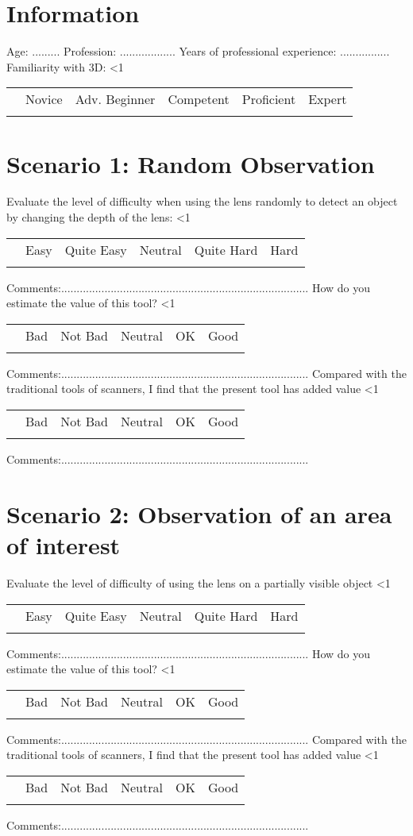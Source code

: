 \documentclass[a4paper]{exam}
\makeatletter
\newcounter{mquestion}
\newcounter{row}
\newcommand\addtabtoks[1]{\@tabtoks\expandafter{\the\@tabtoks#1}}
\newcommand*\resettabtoks{\@tabtoks{}}
\newcommand*\printtabtoks{\the\@tabtoks}
\newcommand\CheckTable[1]{%
  \setcounter{mquestion}{0}
  \setcounter{row}{0}
  \resettabtoks
  \loop\ifnum\therow<#1\relax
    \stepcounter{row}
    \addtabtoks{& $\square$ & $\square$ & $\square$ & $\square$ & $\square$ \\}%
  \repeat
  \begin{longtable}{>{\stepcounter{mquestion}}l*{5}{c}}
    \multicolumn{1}{c}{} & Bad & Not Bad & Neutral & OK & Good \\
    \printtabtoks
  \end{longtable}%
}
\newcommand\CheckTablelevel[1]{%
  \setcounter{mquestion}{0}
  \setcounter{row}{0}
  \resettabtoks
  \loop\ifnum\therow<#1\relax
    \stepcounter{row}
    \addtabtoks{& $\square$ & $\square$ & $\square$ & $\square$ & $\square$ \\}%
  \repeat
  \begin{longtable}{>{\stepcounter{mquestion}}l*{5}{c}}
    \multicolumn{1}{c}{} & Novice &  Adv. Beginner &  Competent & Proficient  & Expert \\
    \printtabtoks
  \end{longtable}%
}
\newcommand\CheckTableDifficulty[1]{%
  \setcounter{mquestion}{0}
  \setcounter{row}{0}
  \resettabtoks
  \loop\ifnum\therow<#1\relax
    \stepcounter{row}
    \addtabtoks{& $\square$ & $\square$ & $\square$ & $\square$ & $\square$ \\}%
  \repeat
  \begin{longtable}{>{\stepcounter{mquestion}}l*{5}{c}}
    \multicolumn{1}{c}{} & Easy & Quite Easy & Neutral & Quite Hard & Hard \\
    \printtabtoks
  \end{longtable}%
}
\makeatother
\begin{document}
\section{Information}

 Age: ......... \newline
 Profession: .................. \newline
 Years of professional experience: ................ \newline
 Familiarity with 3D: 
\CheckTablelevel{1}

\section{Scenario 1: Random Observation }
Evaluate the level of difficulty when using the lens randomly to detect an object by changing the depth of the lens:
\CheckTableDifficulty{1}
Comments:................................................................................ \newline \newline
How do you estimate the value of this tool?
\CheckTable{1}
Comments:................................................................................ \newline \newline
Compared with the traditional tools of scanners, I find that the present tool has added value
\CheckTable{1}
Comments:................................................................................ \newline \newline

\section{Scenario 2: Observation of an area of interest }
Evaluate the level of difficulty of using the lens on a partially visible object
\CheckTableDifficulty{1}
Comments:................................................................................ \newline \newline
How do you estimate the value of this tool?
\CheckTable{1}
Comments:................................................................................ \newline \newline
Compared with the traditional tools of scanners, I find that the present tool has added value
\CheckTable{1}
Comments:................................................................................ 
\end{document}
